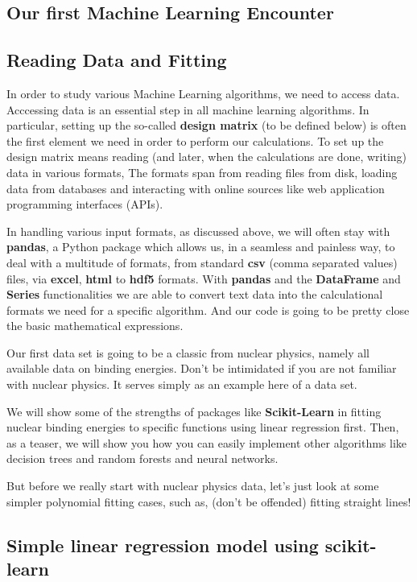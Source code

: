 \documentclass[%
oneside,                 %
final,                   %
10pt]{article}
\begin{document}
\subsection{Our first Machine Learning Encounter}

\subsection{Reading Data and Fitting}

In order to study various Machine Learning algorithms, we need to
access data. Acccessing data is an essential step in all machine
learning algorithms. In particular, setting up the so-called \textbf{design
matrix} (to be defined below) is often the first element we need in
order to perform our calculations. To set up the design matrix means
reading (and later, when the calculations are done, writing) data
in various formats, The formats span from reading files from disk,
loading data from databases and interacting with online sources
like web application programming interfaces (APIs).

In handling various input formats, as discussed above, we will often stay with \textbf{pandas},
a Python package which allows us, in a seamless and painless way, to
deal with a multitude of formats, from standard \textbf{csv} (comma separated
values) files, via \textbf{excel}, \textbf{html} to \textbf{hdf5} formats.  With \textbf{pandas}
and the \textbf{DataFrame}  and \textbf{Series} functionalities we are able to convert text data
into the calculational formats we need for a specific algorithm. And our code is going to be 
pretty close the basic mathematical expressions.

Our first data set is going to be a classic from nuclear physics, namely all
available data on binding energies. Don't be intimidated if you are not familiar with nuclear physics. It serves simply as an example here of a data set. 

We will show some of the
strengths of packages like \textbf{Scikit-Learn} in fitting nuclear binding energies to
specific functions using linear regression first. Then, as a teaser, we will show you how 
you can easily implement other algorithms like decision trees and random forests and neural networks.

But before we really start with nuclear physics data, let's just look at some simpler polynomial fitting cases, such as,
(don't be offended) fitting straight lines!

\subsection{Simple linear regression model using \textbf{scikit-learn}}
\end{document}
